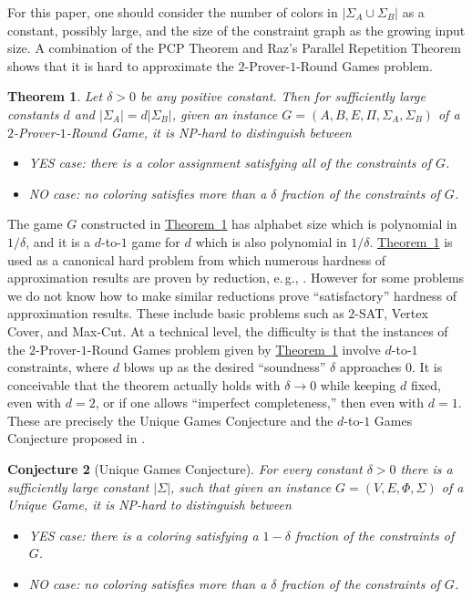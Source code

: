 \documentclass[11pt]{article}
\numberwithin{equation}{section}
\newtheorem{theorem}{Theorem}[section]
\theoremstyle{definition}
\theoremstyle{plain}
\newcommand{\eg}{e.\,g.}
\newcommand{\expref}[2]{\hyperref[#2]{#1~\ref{#2}}}
\newtheorem{rconj}[theorem]{Conjecture}
\newcommand\card[1]{\left| {#1} \right|}
\begin{document}
For this paper, one should consider the number of colors in  $|\Sigma_A\cup\Sigma_B|$ as a constant, possibly large,  and the
size of the constraint graph as the growing input size. A combination of the PCP Theorem \cite{FGLSS96, AS98, ALMSS98} and
Raz's Parallel Repetition Theorem \cite{Raz98} shows that it is hard
to approximate the  $2$-Prover-$1$-Round Games problem.

\begin{theorem}\label{thm:pcp+raz}
Let $\delta>0$ be any positive constant. Then for sufficiently large constants $d$
  and  $|\Sigma_A| = d\card{\Sigma_B}$,
given an instance $G=(A,B,E,\Pi,\Sigma_A,\Sigma_B)$ of a $2$-Prover-$1$-Round Game, it is NP-hard
to distinguish between
\begin{itemize}
\item YES case: there is a color assignment  satisfying all of the constraints of $G$.
\item NO case: no coloring satisfies more
than a %
$\delta$ fraction of the constraints of $G$.
\end{itemize}
\end{theorem}

The game $G$ constructed in \expref{Theorem}{thm:pcp+raz} has alphabet size which is polynomial in $1/\delta$,
and it is a $d$-to-$1$ game for $d$ which is also polynomial in $1/\delta$.
\expref{Theorem}{thm:pcp+raz} is used as a canonical hard problem from
which numerous hardness of approximation results are proven by reduction, \eg, \cite{ABSS, BGS,
Has99,Has01,GHS00,DS05}.
However for some problems we do not know how
to make similar reductions prove ``satisfactory'' hardness of
approximation results. These include basic problems such
as $2$-SAT, Vertex Cover, and Max-Cut. At a technical level, the difficulty is that the instances of the $2$-Prover-$1$-Round Games problem
given by \expref{Theorem}{thm:pcp+raz} involve $d$-to-$1$ constraints,
where $d$ blows up as the desired ``soundness'' $\delta$ approaches $0$. It
is conceivable that the theorem actually holds with $\delta \to 0$ while keeping $d$ fixed, even with $d=2$, or if one allows ``imperfect
completeness,'' then even with $d=1$. These are precisely the Unique Games Conjecture and the $d$-to-$1$ Games Conjecture proposed in \cite{Khot02}.

\begin{rconj} [Unique Games Conjecture]\label{conj:ugc}
For every constant $\delta>0$ there is a sufficiently large constant
$|\Sigma|$, such that  given an instance $G=(V,E,\Phi,\Sigma)$ of a Unique Game, it is NP-hard
to distinguish between
\begin{itemize}
\item YES case: there is a coloring satisfying
a %
$1-\delta$ fraction of the constraints of $G$.
\item NO case: no coloring satisfies more than
a %
$\delta$ fraction of the constraints of $G$.
\end{itemize}
\end{rconj}
\end{document}
